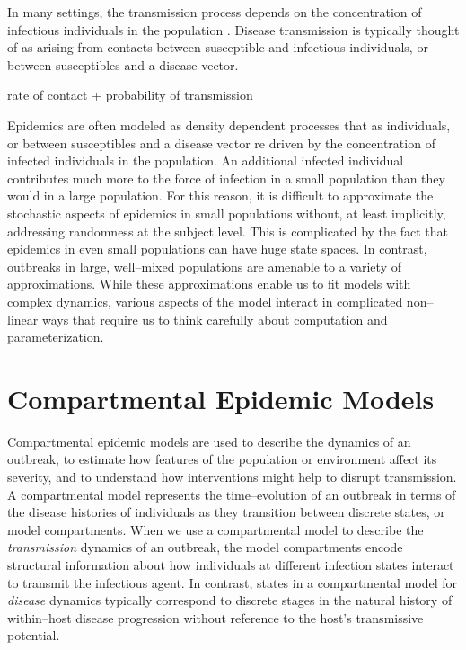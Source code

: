 In many settings, the transmission process depends on the concentration of infectious individuals in the population  \cite{dejong1995does,hu2013scaling,mccallum2001should}. Disease transmission is typically thought of as arising from contacts between  susceptible and infectious individuals, or between susceptibles and a disease vector. 

rate of contact + probability of transmission 

Epidemics are often modeled as density dependent processes that as individuals, or between susceptibles and a disease vector \cite{dejong1995does,hu2013scaling,mccallum2001should}re driven by the concentration of infected individuals in the population. 
An additional infected individual contributes much more to the force of infection in a small population than they would in a large population. For this reason, it is difficult to approximate the stochastic aspects of epidemics in small populations without, at least implicitly, addressing randomness at the subject level. This is complicated by the fact that epidemics in even small populations can have huge state spaces. In contrast, outbreaks in large, well--mixed populations are amenable to a variety of approximations. While these approximations enable us to fit models with complex dynamics, various aspects of the model interact in complicated non--linear ways that require us to think carefully about computation and parameterization. 

\section{Compartmental Epidemic Models}
\label{sec:outbreak_models}

Compartmental epidemic models are used to describe the dynamics of an outbreak, to estimate how features of the population or environment affect its severity, and to understand how interventions might help to disrupt transmission. A compartmental model represents the time--evolution of an outbreak in terms of the disease histories of individuals as they transition between discrete states, or model compartments. When we use a compartmental model to describe the \textit{transmission} dynamics of an outbreak, the model compartments encode structural information about how individuals at different infection states interact to transmit the infectious agent. In contrast, states in a compartmental model for \textit{disease} dynamics typically correspond to discrete stages in the natural history of within--host disease progression without reference to the host's transmissive potential. 

